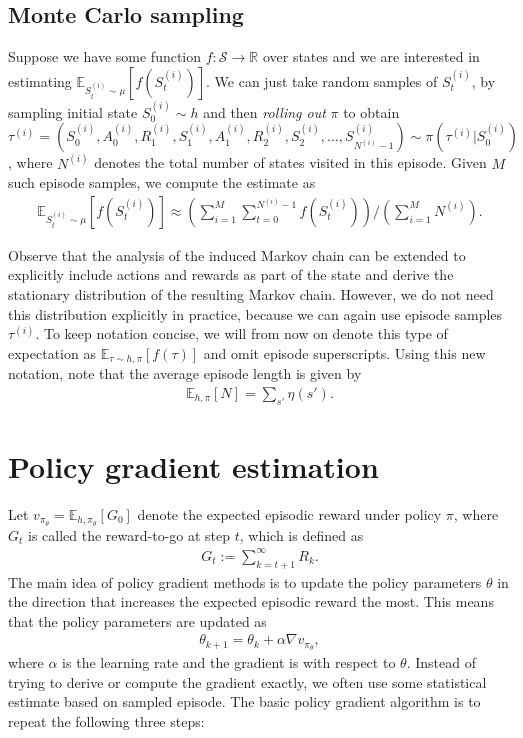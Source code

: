 \documentclass[a4paper]{article}
\begin{document}
\subsection{Monte Carlo sampling}

Suppose we have some function $f : \mathcal{S} \rightarrow \mathbb{R}$ over
states and we are interested in estimating $\mathbb{E}_{S_{t}^{(i)} \sim \mu}[f(S_{t}^{(i)})]$.
%
We can just take random samples of $S_{t}^{(i)}$, by sampling initial state
$S_{0}^{(i)} \sim h$ and then \textit{rolling out} $\pi$ to obtain
$\tau^{(i)} = (S_{0}^{(i)},A_{0}^{(i)},R_{1}^{(i)},S_{1}^{(i)},A_{1}^{(i)},R_{2}^{(i)},S_{2}^{(i)}, \dots, S_{N^{(i)}-1}^{(i)}) \sim \pi(\tau^{(i)} | S_{0}^{(i)})$,
where $N^{(i)}$ denotes the total number of states visited in this episode.
%
Given $M$ such episode samples, we compute the estimate as
\begin{align*}
  \mathbb{E}_{S_{t}^{(i)} \sim \mu} [ f(S_{t}^{(i)}) ] \approx \left( \sum_{i=1}^{M} \sum_{t=0}^{N^{(i)} - 1} f(S_{t}^{(i)}) \right) / \left( \sum_{i=1}^{M} N^{(i)} \right) .
\end{align*}

Observe that the analysis of the induced Markov chain can be extended to
explicitly include actions and rewards as part of the state and derive the
stationary distribution of the resulting Markov chain. However, we do not need
this distribution explicitly in practice, because we can again use episode
samples $\tau^{(i)}$. To keep notation concise, we will from now on denote this
type of expectation as $\mathbb{E}_{\tau \sim h,\pi}[f(\tau)]$ and omit episode
superscripts.
%
Using this new notation, note that the average episode length is given by
\begin{align*}
  \mathbb{E}_{h, \pi} [ N ]= \sum_{s'} \eta(s') .
\end{align*}

\section{Policy gradient estimation}

Let $v_{\pi_{\theta}} = \mathbb{E}_{h,\pi_{\theta}}[G_{0}]$ denote the expected
episodic reward under policy $\pi$, where $G_{t}$ is called the reward-to-go at
step $t$, which is defined as
\begin{align*}
  G_{t} := \sum_{k=t+1}^{\infty} R_{k} .
\end{align*}
The main idea of policy gradient methods is to update the policy parameters
$\theta$ in the direction that increases the expected episodic reward the most. This
means that the policy parameters are updated as
\begin{align*}
  \theta_{k+1} = \theta_{k} + \alpha \nabla v_{\pi_{\theta}} ,
\end{align*}
where $\alpha$ is the learning rate and the gradient is with respect to
$\theta$. Instead of trying to derive or compute the gradient exactly, we often
use some statistical estimate based on sampled episode. The basic policy
gradient algorithm is to repeat the following three steps:
\end{document}
